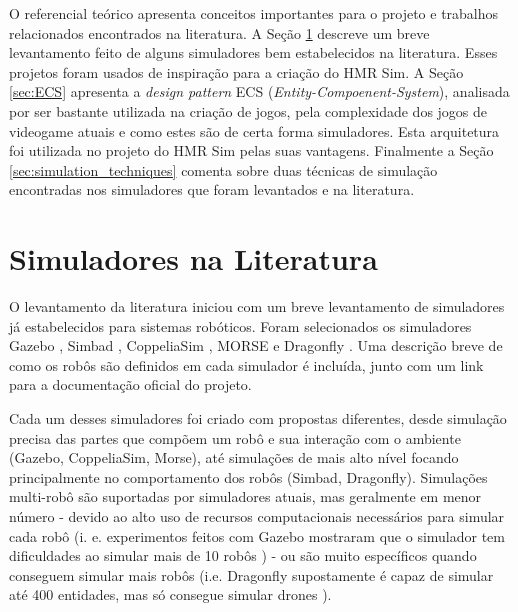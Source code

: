 \label{chapter:referencial}

O referencial teórico apresenta conceitos importantes para o projeto e trabalhos relacionados encontrados na literatura. A Seção \ref{sec:outros_simuladores} descreve um breve levantamento feito de alguns simuladores bem estabelecidos na literatura. Esses projetos foram usados de inspiração para a criação do HMR Sim. A Seção \ref{sec:ECS} apresenta a \textit{design pattern} ECS (\textit{Entity-Compoenent-System}), analisada por ser bastante utilizada na criação de jogos, pela complexidade dos jogos de videogame atuais e como estes são de certa forma simuladores. Esta arquitetura foi utilizada no projeto do HMR Sim pelas suas vantagens. Finalmente a Seção \ref{sec:simulation_techniques} comenta sobre duas técnicas de simulação encontradas nos simuladores que foram levantados e na literatura.

\section{Simuladores na Literatura}
\label{sec:outros_simuladores}

O levantamento da literatura iniciou com um breve levantamento de simuladores já estabelecidos para sistemas robóticos. Foram selecionados os simuladores Gazebo \cite{koenig2004gazebo}, Simbad \cite{hugues2006simbad}, CoppeliaSim \cite{rohmer2013coopeliasim}, MORSE \cite{echeverria2011morse} e Dragonfly \cite{maia2019dragonfly}. Uma descrição breve de como os robôs são definidos em cada simulador é incluída, junto com um link para a documentação oficial do projeto.

Cada um desses simuladores foi criado com propostas diferentes, desde simulação precisa das partes que compõem um robô e sua interação com o ambiente (Gazebo, CoppeliaSim, Morse), até simulações de mais alto nível focando principalmente no comportamento dos robôs (Simbad, Dragonfly). Simulações multi-robô são suportadas por simuladores atuais, mas geralmente em menor número - devido ao alto uso de recursos computacionais necessários para simular cada robô (i. e. experimentos feitos com Gazebo mostraram que o simulador tem dificuldades ao simular mais de 10 robôs \cite{noori20173d}) - ou são muito específicos quando conseguem simular mais robôs (i.e. Dragonfly supostamente é capaz de simular até 400 entidades, mas só consegue simular drones \cite{maia2019dragonfly}).

